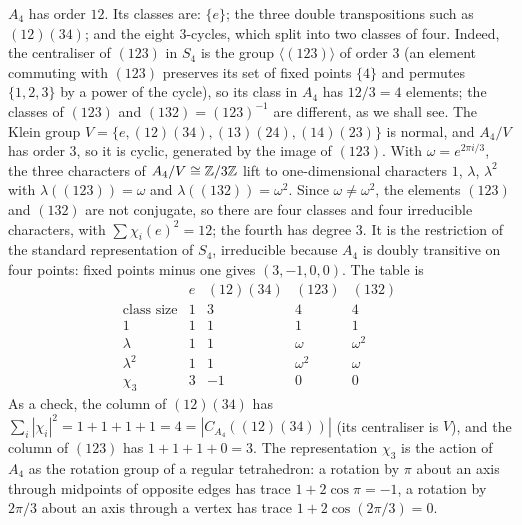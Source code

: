 \begin{example}\label{representation-theory:example-character-table-a4}
$A_4$ has order $12$. Its classes are: $\{e\}$; the three double transpositions such as $(12)(34)$; and the eight $3$-cycles, which split into two classes of four.
Indeed, the centraliser of $(123)$ in $S_4$ is the group $\langle(123)\rangle$ of order $3$ (an element commuting with $(123)$ preserves its set of fixed points $\{4\}$ and
permutes $\{1, 2, 3\}$ by a power of the cycle), so its class in $A_4$ has $12/3 = 4$ elements; the classes of $(123)$ and $(132) = (123)^{-1}$ are different, as we shall see. The Klein group $V = \{e, (12)(34),
(13)(24), (14)(23)\}$ is normal, and $A_4/V$ has order $3$, so it is cyclic, generated by the image of $(123)$. With $\omega = e^{2\pi i/3}$, the three characters of $A_4/V \cong \mathbb{Z}/3\mathbb{Z}$ lift to one-dimensional characters
$1$, $\lambda$, $\lambda^2$ with $\lambda((123)) = \omega$ and $\lambda((132)) = \omega^2$. Since $\omega \neq \omega^2$, the elements $(123)$ and $(132)$ are not conjugate, so there are
four classes and four irreducible characters, with $\sum\chi_i(e)^2 = 12$; the fourth has degree $3$. It is the restriction of the standard representation of $S_4$, irreducible
because $A_4$ is doubly transitive on four points: fixed points minus one gives $(3, -1, 0, 0)$. The table is
\[
\begin{array}{c|cccc}
 & e & (12)(34) & (123) & (132)\\
\text{class size} & 1 & 3 & 4 & 4\\
\hline
1 & 1 & 1 & 1 & 1\\
\lambda & 1 & 1 & \omega & \omega^2\\
\lambda^2 & 1 & 1 & \omega^2 & \omega\\
\chi_3 & 3 & -1 & 0 & 0
\end{array}
\]
As a check, the column of $(12)(34)$ has $\sum_i|\chi_i|^2 = 1 + 1 + 1 + 1 = 4 = |C_{A_4}((12)(34))|$ (its centraliser is $V$), and the column of $(123)$ has $1 + 1 + 1 + 0 = 3$.
The representation $\chi_3$ is the action of $A_4$ as the rotation group of a regular tetrahedron: a rotation by $\pi$ about an axis through midpoints of opposite edges has trace
$1 + 2\cos\pi = -1$, a rotation by $2\pi/3$ about an axis through a vertex has trace $1 + 2\cos(2\pi/3) = 0$.
\end{example}

